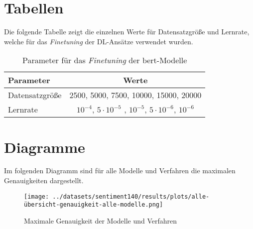 \section{Tabellen}

Die folgende Tabelle zeigt die einzelnen Werte für Datensatzgröße und Lernrate, welche für das \textit{Finetuning} der DL-Ansätze verwendet wurden.

\begin{table}[h]
    \center
    \begin{tabular}{lc}
        \toprule
        Parameter       & Werte                                                   \\
        \midrule
        Datensatzgröße  & 2500, 5000, 7500, 10000, 15000, 20000                   \\
        Lernrate        & $10^{-4}$, $5\cdot 10^{-5}$ , $10^{-5}$, $5\cdot 10^{-6}$, $10^{-6}$  \\
        \bottomrule
    \end{tabular}
    \caption{Parameter für das \textit{Finetuning} der \gls{bert}-Modelle}
    \label{tab:dl-params}
\end{table}

\section{Diagramme}

Im folgenden Diagramm sind für alle Modelle und Verfahren die maximalen Genauigkeiten dargestellt.

\begin{figure}[H]
    \centering
    \texttt{[image: ../datasets/sentiment140/results/plots/alle-übersicht-genauigkeit-alle-modelle.png]}
    \caption{Maximale Genauigkeit der Modelle und Verfahren}
    \label{fig:results}
\end{figure}
